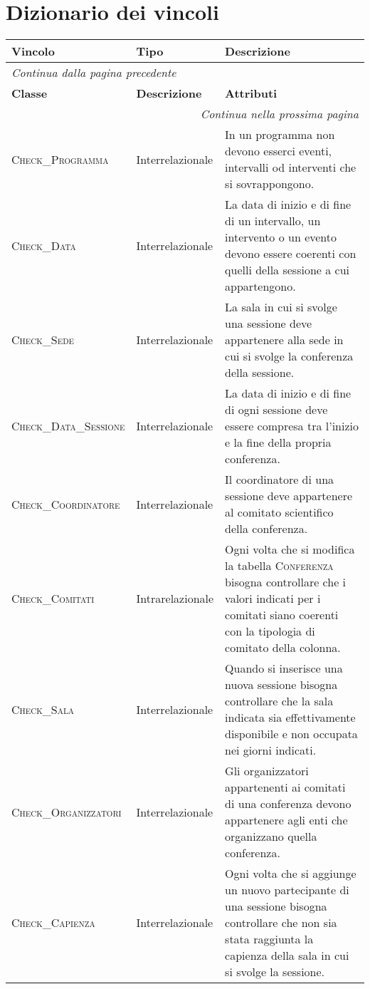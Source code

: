 \section{Dizionario dei vincoli}
\begin{longtable}{|p{}|p{}|p{}|}
	\hline
	\textbf{Vincolo} & \textbf{Tipo} & \textbf{Descrizione} \\
	\hline
	\endfirsthead
	
	\multicolumn{3}{l}{\footnotesize\itshape Continua dalla pagina precedente} \\
	\hline
	\textbf{Classe} & \textbf{Descrizione} & \textbf{Attributi} \\
	\hline
	\endhead
	
	\hline
	\multicolumn{3}{r}{\footnotesize\itshape Continua nella prossima pagina} \\
	\endfoot
	
	\hline
	\endlastfoot
	\textsc{Check\_Programma} & Interrelazionale & In un programma non devono esserci eventi, intervalli od interventi che si sovrappongono. \\
	\hline
	\textsc{Check\_Data} & Interrelazionale & La data di inizio e di fine di un intervallo, un intervento o un evento devono essere coerenti con quelli della sessione a cui appartengono. \\ \hline
	\textsc{Check\_Sede} & Interrelazionale & La sala in cui si svolge una sessione deve appartenere alla sede in cui si svolge la conferenza della sessione. \\ \hline
	\textsc{Check\_Data\_Sessione} & Interrelazionale & La data di inizio e di fine di ogni sessione deve essere compresa tra l'inizio e la fine della propria conferenza. \\ \hline
	\textsc{Check\_Coordinatore} & Interrelazionale & Il coordinatore di una sessione deve appartenere al comitato scientifico della conferenza. \\ \hline
	\textsc{Check\_Comitati} & Intrarelazionale & Ogni volta che si modifica la tabella \textsc{Conferenza} bisogna controllare che i valori indicati per i comitati siano coerenti con la tipologia di comitato della colonna. \\ \hline
	\textsc{Check\_Sala} & Interrelazionale & Quando si inserisce una nuova sessione bisogna controllare che la sala indicata sia effettivamente disponibile e non occupata nei giorni indicati. \\ \hline
	\textsc{Check\_Organizzatori} & Interrelazionale & Gli organizzatori appartenenti ai comitati di una conferenza devono appartenere agli enti che organizzano quella conferenza. \\ \hline
	\textsc{Check\_Capienza} & Interrelazionale & Ogni volta che si aggiunge un nuovo partecipante di una sessione bisogna controllare che non sia stata raggiunta la capienza della sala in cui si svolge la sessione. \\
	 
	
\end{longtable}